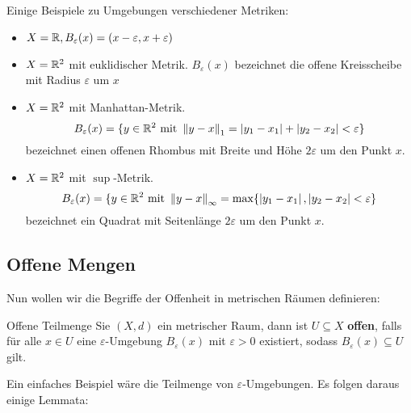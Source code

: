 \begin{example} Einige Beispiele zu Umgebungen verschiedener Metriken:
\begin{itemize}
    \item $X=\mathbb{R}, B_\varepsilon(x) = (x-\varepsilon, x+\varepsilon)$
    \item $X=\mathbb{R}^2$ mit euklidischer Metrik. $B_\varepsilon(x)$ bezeichnet die offene Kreisscheibe mit Radius $\varepsilon$ um $x$
    \item $X=\mathbb{R}^2$ mit Manhattan-Metrik. $$B_\varepsilon(x) = \{y \in \mathbb{R}^2 \text{ mit } \left\|y-x\right\|_1 = \left|y_1-x_1\right| + \left|y_2-x_2\right| < \varepsilon\}$$ bezeichnet einen offenen Rhombus mit Breite und Höhe $2\varepsilon$ um den Punkt $x$.
    \item $X = \mathbb{R}^2$ mit $\sup$-Metrik. $$B_\varepsilon(x) = \{y \in \mathbb{R}^2\text{ mit }\left\|y-x\right\|_\infty = \max\{\left|y_1-x_1\right|, \left|y_2-x_2\right| < \varepsilon\}$$ bezeichnet ein Quadrat mit Seitenlänge $2\varepsilon$ um den Punkt $x$.
\end{itemize}
\end{example}

\subsection{Offene Mengen}\label{cha_offenheit}
Nun wollen wir die Begriffe der Offenheit in metrischen Räumen definieren:

\begin{definition}{Offene Teilmenge}{}
Sie $(X, d)$ ein metrischer Raum, dann ist $U \subseteq X$ \textbf{offen}, falls für alle $x \in U$ eine $\varepsilon$-Umgebung $B_\varepsilon(x)$ mit $\varepsilon >0$ existiert, sodass $B_\varepsilon(x) \subseteq U$ gilt.
\end{definition}
Ein einfaches Beispiel wäre die Teilmenge von $\varepsilon$-Umgebungen. Es folgen daraus einige Lemmata:

